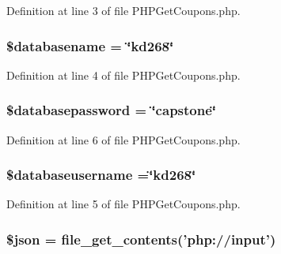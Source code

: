 Definition at line 3 of file P\-H\-P\-Get\-Coupons.\-php.

\hypertarget{_p_h_p_get_coupons_8php_aace53f8afce81b52040cef0cd850138a}{
\subsubsection[{\$databasename}]{\setlength{\rightskip}{0pt plus 5cm}\$databasename = \char`\"{}kd268\char`\"{}}}\label{_p_h_p_get_coupons_8php_aace53f8afce81b52040cef0cd850138a}


Definition at line 4 of file P\-H\-P\-Get\-Coupons.\-php.

\hypertarget{_p_h_p_get_coupons_8php_a1a07536b6a5f43f2d8f826bd2ee6c91a}{
\subsubsection[{\$databasepassword}]{\setlength{\rightskip}{0pt plus 5cm}\$databasepassword = \char`\"{}capstone\char`\"{}}}\label{_p_h_p_get_coupons_8php_a1a07536b6a5f43f2d8f826bd2ee6c91a}


Definition at line 6 of file P\-H\-P\-Get\-Coupons.\-php.

\hypertarget{_p_h_p_get_coupons_8php_a251bf75f510d7c8b556c65d7c30e911f}{
\subsubsection[{\$databaseusername}]{\setlength{\rightskip}{0pt plus 5cm}\$databaseusername =\char`\"{}kd268\char`\"{}}}\label{_p_h_p_get_coupons_8php_a251bf75f510d7c8b556c65d7c30e911f}


Definition at line 5 of file P\-H\-P\-Get\-Coupons.\-php.

\hypertarget{_p_h_p_get_coupons_8php_acedd13b51401130848ce18f4d5c52605}{
\subsubsection[{\$json}]{\setlength{\rightskip}{0pt plus 5cm}\$json = file\-\_\-get\-\_\-contents('php\-://input')}}\label{_p_h_p_get_coupons_8php_acedd13b51401130848ce18f4d5c52605}


